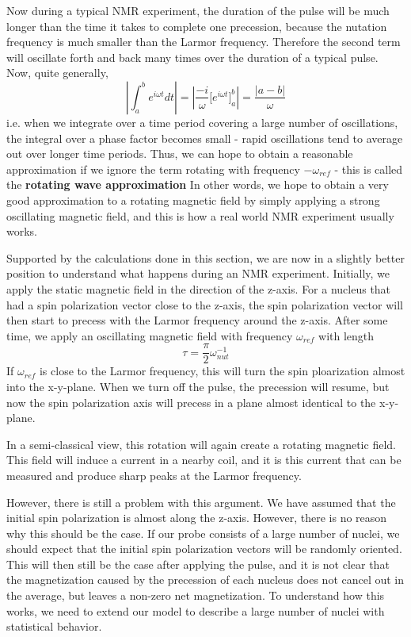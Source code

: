 \documentclass[a4paper, draft]{article}
\theoremstyle{own}
\theoremstyle{remark}
\begin{document}
Now during a typical NMR experiment, the duration of the pulse will be much longer than the time it takes to complete one precession, because the nutation frequency is much smaller than the Larmor frequency. Therefore the second term will oscillate forth and back many times over the duration of a typical pulse. Now, quite generally, 
$$
| \int_a^b e^{i\omega t} dt | = | \frac{-i}{\omega } \big[ e^{i\omega t} \big]_a^b | = \frac{|a-b|}{\omega}
$$
i.e. when we integrate over a time period covering a large number of oscillations, the integral over a phase factor becomes small - rapid oscillations tend to average out over longer time periods. Thus, we can hope to obtain a reasonable approximation if we ignore the term rotating with frequency $-\omega_{ref}$ - this is called the {\bf rotating wave approximation} In other words, we hope to obtain a very good approximation to a rotating magnetic field by simply applying a strong oscillating magnetic field, and this is how a real world NMR experiment usually works. 

Supported by the calculations done in this section, we are now in a slightly better position to understand what happens during an NMR experiment. Initially, we apply the static magnetic field in the direction of the z-axis. For a nucleus that had a spin polarization vector close to the z-axis, the spin polarization vector will then start to precess with the Larmor frequency around the z-axis. After some time, we apply an oscillating magnetic field with frequency $\omega_{ref}$ with length 
$$
\tau = \frac{\pi}{2} \omega_{nut}^{-1}
$$
If $\omega_{ref}$ is close to the Larmor frequency, this will turn the spin ploarization almost into the x-y-plane. When we turn off the pulse, the precession will resume, but now the spin polarization axis will precess in a plane almost identical to the x-y-plane.  

In a semi-classical view, this rotation will again create a rotating magnetic field. This field will induce a current in a nearby coil, and it is this current that can be measured and produce sharp peaks at the Larmor frequency.

However, there is still a problem with this argument. We have assumed that the initial spin polarization is almost along the z-axis. However, there is no reason why this should be the case. If our probe consists of a large number of nuclei, we should expect that the initial spin polarization vectors will be randomly oriented. This will then still be the case after applying the pulse, and it is not clear that the magnetization caused by the precession of each nucleus does not cancel out in the average, but leaves a non-zero net magnetization. To understand how this works, we need to extend our model to describe a large number of nuclei with statistical behavior.
\end{document}
